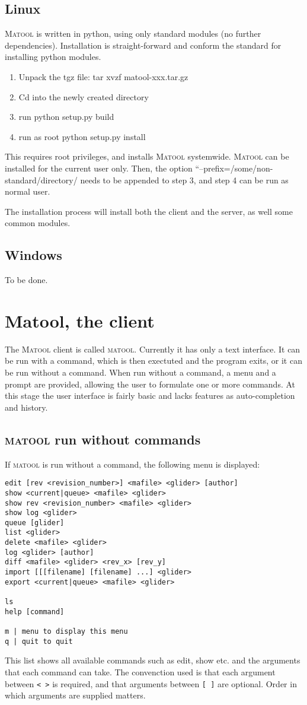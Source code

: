 \documentclass{article}
\newcommand{\mt}{\textsc{Matool}}
\newcommand{\mtc}{\textsc{matool}}
\begin{document}
\subsection{Linux}
\mt{} is written in python, using only standard modules (no further
dependencies). Installation is straight-forward and conform the
standard for installing python modules.

\begin{enumerate}
\item Unpack the tgz file: tar xvzf matool-xxx.tar.gz
\item Cd into the newly created directory
\item run python setup.py build
\item run as root python setup.py install
\end{enumerate}
This requires root privileges, and installs \mt{} systemwide. \mt{}
can be installed for the current user only. Then, the option
``--prefix=/some/non-standard/directory/ needs to be appended to step
3, and step 4 can be run as normal user.

The installation process will install both the client and the server,
as well some common modules.
\subsection{Windows}
To be done.

\section{Matool, the client}
The \mt{} client is called \mtc{}. Currently it has only a text
interface. It can be run with a command, which is then exectuted and
the program exits, or it can be run without a command. When run
without a command, a menu and a prompt are provided, allowing the user
to formulate one or more commands. At this stage the user interface is
fairly basic and lacks features as auto-completion and history.

\subsection{\mtc{} run without commands}
If \mtc{} is run without a command, the following menu is displayed:
\begin{verbatim}
edit [rev <revision_number>] <mafile> <glider> [author]
show <current|queue> <mafile> <glider>
show rev <revision_number> <mafile> <glider>
show log <glider>
queue [glider]
list <glider>
delete <mafile> <glider>
log <glider> [author]
diff <mafile> <glider> <rev_x> [rev_y]
import [[[filename] [filename] ...] <glider>
export <current|queue> <mafile> <glider>

ls
help [command]

m | menu to display this menu
q | quit to quit
\end{verbatim}
This list shows all available commands such as edit, show etc. and the
arguments that each command can take. The convenction used is that
each argument between \verb+< >+ is required, and that arguments
between \verb+[ ]+ are optional. Order in which arguments are supplied
matters.
\end{document}
